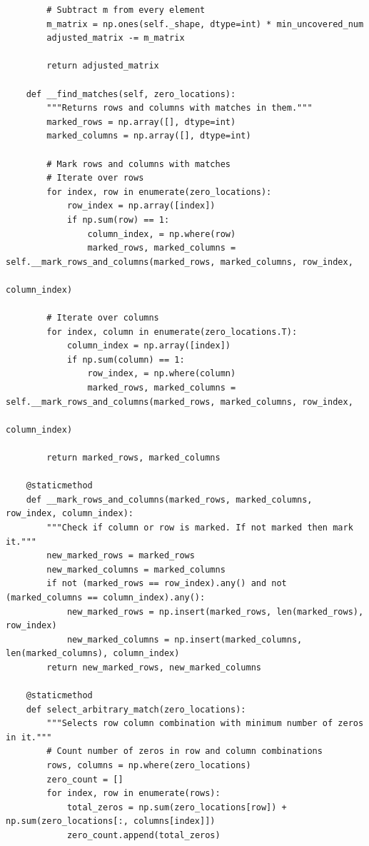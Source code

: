 \documentclass[12pt, letterpaper, twoside]{book}
\begin{document}
\begin{lstlisting}
        # Subtract m from every element
        m_matrix = np.ones(self._shape, dtype=int) * min_uncovered_num
        adjusted_matrix -= m_matrix

        return adjusted_matrix

    def __find_matches(self, zero_locations):
        """Returns rows and columns with matches in them."""
        marked_rows = np.array([], dtype=int)
        marked_columns = np.array([], dtype=int)

        # Mark rows and columns with matches
        # Iterate over rows
        for index, row in enumerate(zero_locations):
            row_index = np.array([index])
            if np.sum(row) == 1:
                column_index, = np.where(row)
                marked_rows, marked_columns = self.__mark_rows_and_columns(marked_rows, marked_columns, row_index,
                                                                           column_index)

        # Iterate over columns
        for index, column in enumerate(zero_locations.T):
            column_index = np.array([index])
            if np.sum(column) == 1:
                row_index, = np.where(column)
                marked_rows, marked_columns = self.__mark_rows_and_columns(marked_rows, marked_columns, row_index,
                                                                           column_index)

        return marked_rows, marked_columns

    @staticmethod
    def __mark_rows_and_columns(marked_rows, marked_columns, row_index, column_index):
        """Check if column or row is marked. If not marked then mark it."""
        new_marked_rows = marked_rows
        new_marked_columns = marked_columns
        if not (marked_rows == row_index).any() and not (marked_columns == column_index).any():
            new_marked_rows = np.insert(marked_rows, len(marked_rows), row_index)
            new_marked_columns = np.insert(marked_columns, len(marked_columns), column_index)
        return new_marked_rows, new_marked_columns

    @staticmethod
    def select_arbitrary_match(zero_locations):
        """Selects row column combination with minimum number of zeros in it."""
        # Count number of zeros in row and column combinations
        rows, columns = np.where(zero_locations)
        zero_count = []
        for index, row in enumerate(rows):
            total_zeros = np.sum(zero_locations[row]) + np.sum(zero_locations[:, columns[index]])
            zero_count.append(total_zeros)


\end{lstlisting}
\end{document}
